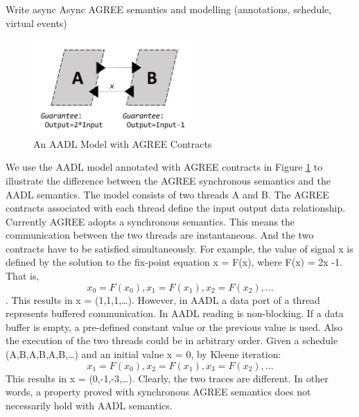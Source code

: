 Write async
Async AGREE semantics and modelling (annotations, schedule, virtual events)

\begin{figure}[ht!]
\centering
\includegraphics[width=60mm]{motivation.jpg}
\caption{An AADL Model with AGREE Contracts\label{motivation}}
\end{figure}

We use the AADL model annotated with AGREE contracts in Figure \ref{motivation} to illustrate the difference between the AGREE synchronous semantics and the AADL semantics. The model consists of two threads A and B. The AGREE contracts associated with each thread define the input output data relationship. Currently AGREE adopts a synchronous semantics. This means the communication between the two threads are instantaneous. And the two contracts have to be satisfied simultaneously. For example, the value of signal x is defined by the solution to the fix-point equation x = F(x), where F(x) = 2x -1. That is, \[x_0 = F(x_0), x_1 = F(x_1), x_2 = F(x_2), ...\]. This results in x = (1,1,1,…). However, in AADL a data port of a thread represents buffered communication.  In AADL reading is non-blocking. If a data buffer is empty, a pre-defined constant value or the previous value is used. Also the execution of the two threads could be in arbitrary order. Given a schedule (A,B,A,B,A,B,…) and an initial value x = 0,  by Kleene iteration: \[x_1 = F(x_0), x_2 = F(x_1), x_3 = F(x_2),...\] This results in x = (0,-1,-3,…). Clearly, the two traces are different. In other words, a property proved with synchronous AGREE semantics does not necessarily hold with AADL semantics.



